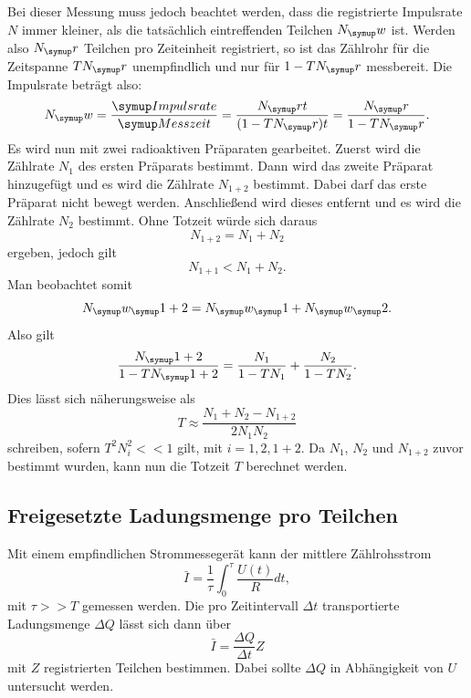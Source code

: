 Bei dieser Messung muss jedoch beachtet werden, dass die registrierte Impulsrate $N$
immer kleiner, als die tatsächlich eintreffenden Teilchen $N_\su{w}$ ist.
Werden also $N_\su{r}$ Teilchen pro Zeiteinheit registriert, so ist das Zählrohr für
die Zeitspanne $TN_\su{r}$ unempfindlich und nur für $1-TN_\su{r}$ messbereit.
Die Impulsrate beträgt also:
\begin{equation}
  N_\su{w} = \frac{\su{Impulsrate}}{\su{Messzeit}} = \frac{N_\su{r}t}{(1-TN_\su{r})t} =
  \frac{N_\su{r}}{1-TN_\su{r}}.
\end{equation}
Es wird nun mit zwei radioaktiven Präparaten gearbeitet. Zuerst wird die
Zählrate $N_1$ des ersten Präparats bestimmt. Dann wird das zweite Präparat hinzugefügt
und es wird die Zählrate $N_{1+2}$ bestimmt. Dabei darf das erste Präparat nicht bewegt
werden. Anschließend wird dieses entfernt und es wird die Zählrate $N_2$
bestimmt. Ohne Totzeit würde sich daraus
\begin{equation}
  N_{1+2} = N_1 + N_2
\end{equation}
ergeben, jedoch gilt
\begin{equation}
  N_{1+1} < N_1 + N_2.
\end{equation}
Man beobachtet somit
\begin{equation}
  N_\su{w_\su{1+2}} = N_\su{w_\su{1}} + N_\su{w_\su{2}}.
\end{equation}
Also gilt
\begin{equation}
  \frac{N_\su{1+2}}{1-TN_\su{1+2}} = \frac{N_1}{1-TN_1} + \frac{N_2}{1-TN_2}.
\end{equation}
Dies lässt sich näherungsweise als
\begin{equation}
  T \approx \frac{N_1 + N_2 - N_{1+2}}{2N_1 N_2}
  \label{eqn:tot}
\end{equation}
schreiben, sofern $T^2N_i^2 << 1$ gilt, mit $ i = 1, 2, 1+2$.
Da $N_1$, $N_2$ und $N_{1+2}$ zuvor bestimmt wurden, kann nun die Totzeit $T$
berechnet werden.

\subsection{Freigesetzte Ladungsmenge pro Teilchen}
Mit einem empfindlichen Strommessegerät kann der mittlere Zählrohsstrom
\begin{equation}
  \bar{I} = \frac{1}{\tau} \int_0^{\tau} \frac{U(t)}{R}dt,
\end{equation}
mit $\tau >> T$ gemessen werden.
Die pro Zeitintervall $\Delta t$ transportierte Ladungsmenge $\Delta Q$
lässt sich dann über
\begin{equation}
  \bar{I} = \frac{\Delta Q} {\Delta t} Z
  \label{eqn:lad}
\end{equation}
mit $Z$ registrierten Teilchen bestimmen. Dabei sollte $\Delta Q$ in Abhängigkeit
von $U$ untersucht werden.
